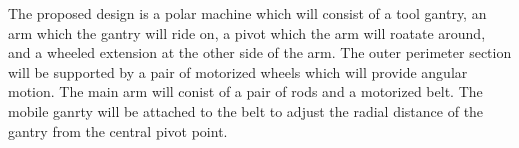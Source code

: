 The proposed design is a polar machine which will consist of a tool gantry, an arm which the gantry will ride on, a pivot which the arm will roatate around, and a wheeled extension at the other side of the arm.
The outer perimeter section will be supported by a pair of motorized wheels which will provide angular motion.
The main arm will conist of a pair of rods and a motorized belt. The mobile ganrty will be attached to the belt to adjust the radial distance of the gantry from the central pivot point. 